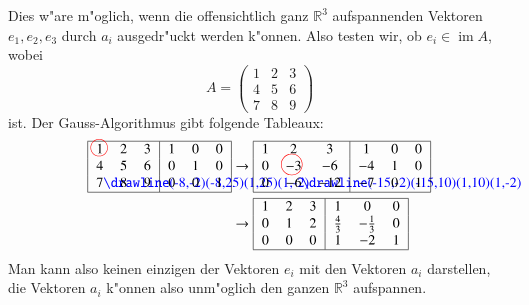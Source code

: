 \begin{beispiel}
Dies w"are m"oglich, wenn die offensichtlich ganz $\mathbb R^3$
aufspannenden Vektoren $e_1,e_2,e_3$ durch $a_i$ ausgedr"uckt werden
k"onnen.
Also testen wir, ob $e_i\in \operatorname{im}A$, wobei
\[
A=\begin{pmatrix}
1&2&3\\
4&5&6\\
7&8&9
\end{pmatrix}
\]
ist.
Der Gauss-Algorithmus gibt folgende Tableaux:
\begin{align*}
\begin{tabular}{|>{$}c<{$}>{$}c<{$}>{$}c<{$}|>{$}c<{$}>{$}c<{$}>{$}c<{$}|}
\hline
1%
\begin{picture}(0,0)
\color{red}\put(-3,4){\circle{12}}
\end{picture}%
&2&3&1&0&0\\
4&5&6&0&1&0\\
7%
\begin{picture}(0,0)
\color{blue}\drawline(-8,-2)(-8,25)(1,25)(1,-2)
\end{picture}%
&8&9&0&0&1\\
\hline
\end{tabular}
&\rightarrow
\begin{tabular}{|>{$}c<{$}>{$}c<{$}>{$}c<{$}|>{$}c<{$}>{$}c<{$}>{$}c<{$}|}
\hline
1&2&3&1&0&0\\
0&-3%
\begin{picture}(0,0)
\color{red}\put(-7,4){\circle{15}}
\end{picture}%
&-6&-4&1&0\\
0&-6%
\begin{picture}(0,0)
\color{blue}\drawline(-15,-2)(-15,10)(1,10)(1,-2)
\end{picture}%
&-12&-7&0&1\\
\hline
\end{tabular}
\\
&\rightarrow
\begin{tabular}{|>{$}c<{$}>{$}c<{$}>{$}c<{$}|>{$}c<{$}>{$}c<{$}>{$}c<{$}|}
\hline
1&2&3&1&0&0\\
0&1&2&\frac43&-\frac13&0\\
0&0&0&1&-2&1\\
\hline
\end{tabular}
\end{align*}
Man kann also keinen einzigen der Vektoren $e_i$ mit den Vektoren $a_i$
darstellen, die Vektoren $a_i$ k"onnen also unm"oglich den ganzen
$\mathbb R^3$ aufspannen.
\end{beispiel}

